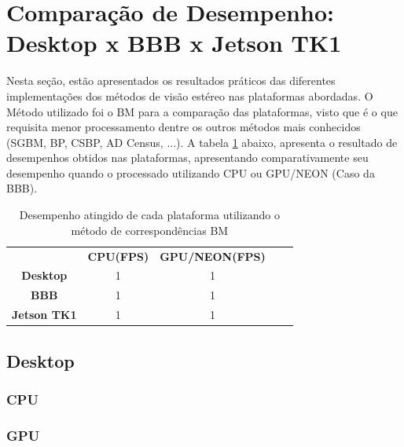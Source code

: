 \section{Comparação de Desempenho: Desktop x BBB x Jetson TK1}

Nesta seção, estão apresentados os resultados práticos das diferentes implementações dos métodos de visão estéreo nas plataformas abordadas. O Método utilizado foi o BM para a comparação das plataformas, visto que é o que requisita menor processamento dentre os outros métodos mais conhecidos (SGBM, BP, CSBP, AD Census, ...). A tabela \ref{resultsCPUGPU} abaixo, apresenta o resultado de desempenhos obtidos nas plataformas, apresentando comparativamente seu desempenho quando o processado utilizando CPU ou GPU/NEON (Caso da BBB).

\begin{table}[]
\centering
\caption{Desempenho atingido de cada plataforma utilizando o método de correspondências BM}
\label{resultsCPUGPU}
\begin{tabular}{c|c|c|ll}
\cline{2-3}
                                          & \textbf{CPU(FPS)} & \textbf{GPU/NEON(FPS)} &  &  \\ \cline{1-3}
\multicolumn{1}{|c|}{\textbf{Desktop}}    & 1                 & 1                      &  &  \\ \cline{1-3}
\multicolumn{1}{|c|}{\textbf{BBB}}        & 1                 & 1                      &  &  \\ \cline{1-3}
\multicolumn{1}{|c|}{\textbf{Jetson TK1}} & 1                 & 1                      &  &  \\ \cline{1-3}
\end{tabular}
\end{table}


\subsection{Desktop}
\subsubsection{CPU}
\subsubsection{GPU}


